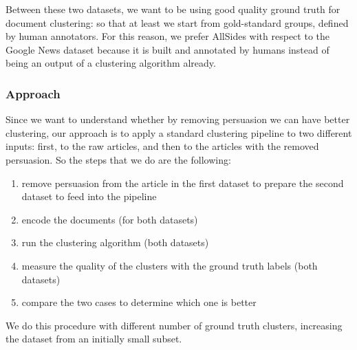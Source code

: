 Between these two datasets, we want to be using good quality ground truth for document clustering: so that at least we start from gold-standard groups, defined by human annotators. For this reason, we prefer AllSides with respect to the Google News dataset because it is built and annotated by humans instead of being an output of a clustering algorithm already.





\subsubsection{Approach}

Since we want to understand whether by removing persuasion we can have better clustering, our approach is to apply a standard clustering pipeline to two different inputs: first, to the raw articles, and then to the articles with the removed persuasion. So the steps that we do are the following:
\begin{enumerate}
    \item remove persuasion from the article in the first dataset to prepare the second dataset to feed into the pipeline
    \item encode the documents (for both datasets)
    \item run the clustering algorithm (both datasets)
    \item measure the quality of the clusters with the ground truth labels (both datasets)
    \item compare the two cases to determine which one is better
\end{enumerate}

We do this procedure with different number of ground truth clusters, increasing the dataset from an initially small subset.%

